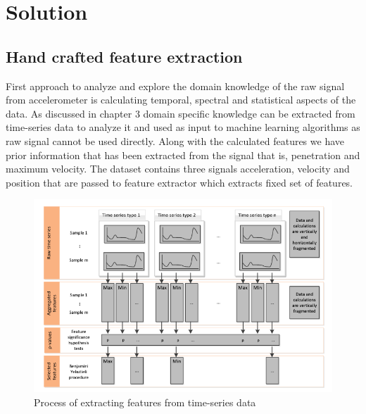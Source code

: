 

    \chapter{Solution}

   \section{Hand crafted feature extraction}  
   First approach to analyze and explore the domain knowledge of the raw signal from accelerometer is calculating temporal, spectral and statistical aspects of the data. As discussed in chapter 3 domain specific knowledge can be extracted from time-series data to analyze it and used as input to machine learning algorithms as raw signal cannot be used directly. Along with the calculated features we have prior information that has been extracted from the signal that is, penetration and maximum velocity. The dataset contains three signals acceleration, velocity and position that are passed to feature extractor which extracts fixed set of features.
   
      \begin{figure}
      	\centering
      	\includegraphics[width=1.2\linewidth]{images/hcta.png}
      	\caption{Process of extracting features from time-series data \cite{christ2016distributed}}
      	\label{n0}
      \end{figure}
   
